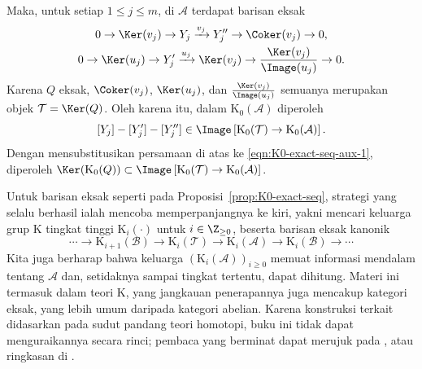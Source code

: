 \begin{bukti}
Maka, untuk setiap $1\leq j\leq m$, di $\mathcal{A}$ terdapat barisan eksak
\begin{gather*}
	0\to\Ker(v_j)\to Y_j\xrightarrow{v_j}Y''_j
	\to\Coker(v_j)\to0,\\
	0\to\Ker(u_j)\to Y'_j\xrightarrow{u_j}\Ker(v_j)
	\to\frac{\Ker(v_j)}{\Image(u_j)}\to0.
\end{gather*}
Karena $Q$ eksak, $\Coker(v_j)$, $\Ker(u_j)$, dan
$\frac{\Ker(v_j)}{\Image(u_j)}$ semuanya merupakan objek
$\mathcal{T}=\Ker(Q)$. Oleh karena itu, dalam
$\mathrm{K}_0(\mathcal{A})$ diperoleh
\[[Y_j]-[Y'_j]-[Y''_j]\in
\Image\left[\mathrm{K}_0(\mathcal{T})
\to\mathrm{K}_0(\mathcal{A})\right].\]
Dengan mensubstitusikan persamaan di atas ke
\eqref{eqn:K0-exact-seq-aux-1}, diperoleh
$\Ker(\mathrm{K}_0(Q))\subset
\Image\left[\mathrm{K}_0(\mathcal{T})
\to\mathrm{K}_0(\mathcal{A})\right]$.
\end{bukti}

Untuk barisan eksak seperti pada
Proposisi~\ref{prop:K0-exact-seq}, strategi yang selalu berhasil ialah
mencoba memperpanjangnya ke kiri, yakni mencari keluarga grup K tingkat
tinggi $\mathrm{K}_i(\cdot)$ untuk $i\in\Z_{\geq0}$, beserta barisan eksak
kanonik
\[\cdots\to\mathrm{K}_{i+1}(\mathcal{B})
\to\mathrm{K}_i(\mathcal{T})\to\mathrm{K}_i(\mathcal{A})
\to\mathrm{K}_i(\mathcal{B})\to\cdots\]
Kita juga berharap bahwa keluarga
$(\mathrm{K}_i(\mathcal{A}))_{i\geq0}$ memuat informasi mendalam tentang
$\mathcal{A}$ dan, setidaknya sampai tingkat tertentu, dapat dihitung.
Materi ini termasuk dalam teori K, yang jangkauan penerapannya juga mencakup
kategori eksak, yang lebih umum daripada kategori abelian. Karena konstruksi
terkait didasarkan pada sudut pandang teori homotopi, buku ini tidak dapat
menguraikannya secara rinci; pembaca yang berminat dapat merujuk pada
\cite{Lai19}, atau ringkasan di \cite[\S 13.6]{Bu10}.
